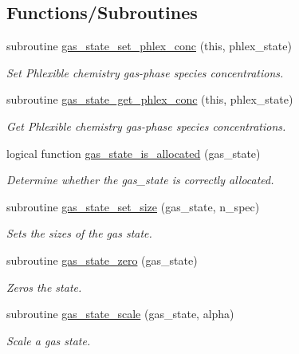 \subsection*{Functions/\+Subroutines}
\begin{DoxyCompactItemize}
\item 
subroutine \mbox{\hyperlink{namespacepmc__gas__state_a4bb5e19ab85b92dac65f973abcfcc416}{gas\+\_\+state\+\_\+set\+\_\+phlex\+\_\+conc}} (this, phlex\+\_\+state)
\begin{DoxyCompactList}\small\item\em Set Phlexible chemistry gas-\/phase species concentrations. \end{DoxyCompactList}\item 
subroutine \mbox{\hyperlink{namespacepmc__gas__state_a93dce5fa598274335861553be37d27f0}{gas\+\_\+state\+\_\+get\+\_\+phlex\+\_\+conc}} (this, phlex\+\_\+state)
\begin{DoxyCompactList}\small\item\em Get Phlexible chemistry gas-\/phase species concentrations. \end{DoxyCompactList}\item 
logical function \mbox{\hyperlink{namespacepmc__gas__state_a589f5022a3cc8311ce829f31b8f4f641}{gas\+\_\+state\+\_\+is\+\_\+allocated}} (gas\+\_\+state)
\begin{DoxyCompactList}\small\item\em Determine whether the {\ttfamily gas\+\_\+state} is correctly allocated. \end{DoxyCompactList}\item 
subroutine \mbox{\hyperlink{namespacepmc__gas__state_aa5f6579f91a3e4b7bfb959af9624088d}{gas\+\_\+state\+\_\+set\+\_\+size}} (gas\+\_\+state, n\+\_\+spec)
\begin{DoxyCompactList}\small\item\em Sets the sizes of the gas state. \end{DoxyCompactList}\item 
subroutine \mbox{\hyperlink{namespacepmc__gas__state_a041688687cbca4258024f99f99c679ea}{gas\+\_\+state\+\_\+zero}} (gas\+\_\+state)
\begin{DoxyCompactList}\small\item\em Zeros the state. \end{DoxyCompactList}\item 
subroutine \mbox{\hyperlink{namespacepmc__gas__state_ab16ebc3648f8854efd45182cfb2097ca}{gas\+\_\+state\+\_\+scale}} (gas\+\_\+state, alpha)
\begin{DoxyCompactList}\small\item\em Scale a gas state. \end{DoxyCompactList}\item 

\end{DoxyCompactItemize}
